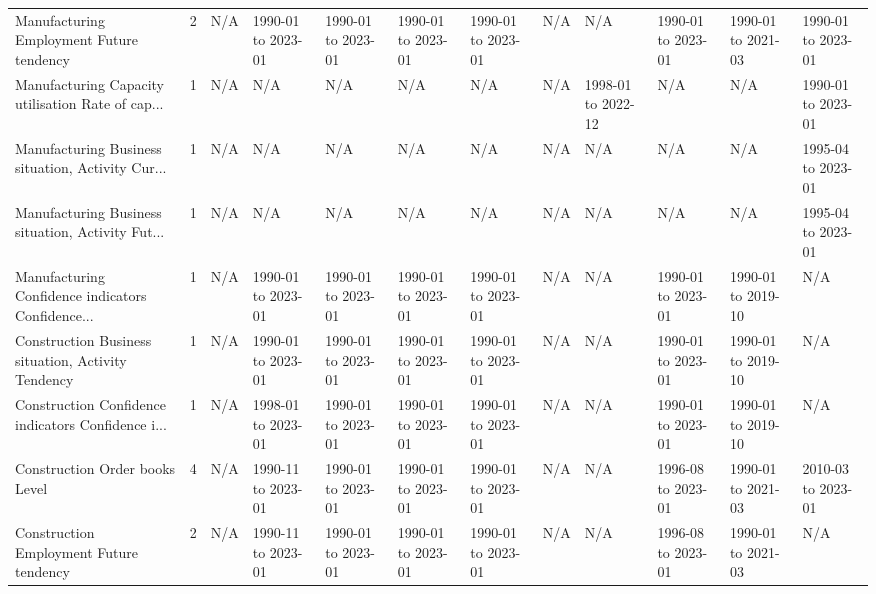 \begin{table}
\begin{tabular}{@{}llYYYYYYYY@{}}
         Manufacturing  Employment Future tendency &     2 &                N/A & 1990-01 to 2023-01 & 1990-01 to 2023-01 & 1990-01 to 2023-01 & 1990-01 to 2023-01 &                N/A &                N/A & 1990-01 to 2023-01 & 1990-01 to 2021-03 & 1990-01 to 2023-01 \\
Manufacturing  Capacity utilisation Rate of cap... &     1 &                N/A &                N/A &                N/A &                N/A &                N/A &                N/A & 1998-01 to 2022-12 &                N/A &                N/A & 1990-01 to 2023-01 \\
Manufacturing  Business situation, Activity Cur... &     1 &                N/A &                N/A &                N/A &                N/A &                N/A &                N/A &                N/A &                N/A &                N/A & 1995-04 to 2023-01 \\
Manufacturing  Business situation, Activity Fut... &     1 &                N/A &                N/A &                N/A &                N/A &                N/A &                N/A &                N/A &                N/A &                N/A & 1995-04 to 2023-01 \\
Manufacturing  Confidence indicators Confidence... &     1 &                N/A & 1990-01 to 2023-01 & 1990-01 to 2023-01 & 1990-01 to 2023-01 & 1990-01 to 2023-01 &                N/A &                N/A & 1990-01 to 2023-01 & 1990-01 to 2019-10 &                N/A \\
Construction Business situation, Activity Tendency &     1 &                N/A & 1990-01 to 2023-01 & 1990-01 to 2023-01 & 1990-01 to 2023-01 & 1990-01 to 2023-01 &                N/A &                N/A & 1990-01 to 2023-01 & 1990-01 to 2019-10 &                N/A \\
Construction Confidence indicators Confidence i... &     1 &                N/A & 1998-01 to 2023-01 & 1990-01 to 2023-01 & 1990-01 to 2023-01 & 1990-01 to 2023-01 &                N/A &                N/A & 1990-01 to 2023-01 & 1990-01 to 2019-10 &                N/A \\
                    Construction Order books Level &     4 &                N/A & 1990-11 to 2023-01 & 1990-01 to 2023-01 & 1990-01 to 2023-01 & 1990-01 to 2023-01 &                N/A &                N/A & 1996-08 to 2023-01 & 1990-01 to 2021-03 & 2010-03 to 2023-01 \\
           Construction Employment Future tendency &     2 &                N/A & 1990-11 to 2023-01 & 1990-01 to 2023-01 & 1990-01 to 2023-01 & 1990-01 to 2023-01 &                N/A &                N/A & 1996-08 to 2023-01 & 1990-01 to 2021-03 &                N/A \\

\end{tabular}
\end{table}
